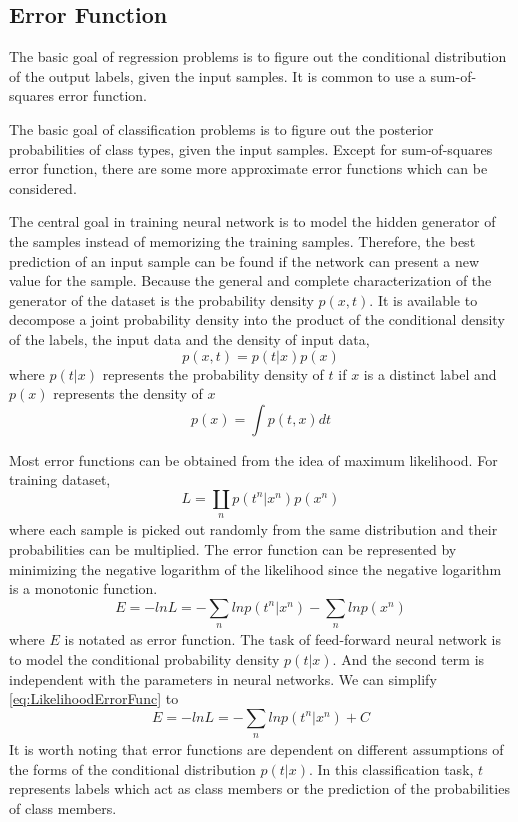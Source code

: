 \subsection{Error Function}

The basic goal of regression problems is to figure out the conditional distribution of the output labels, given the input samples. It is common to use a sum-of-squares error function.

The basic goal of classification problems is to figure out the posterior probabilities of class types, given the input samples. Except for sum-of-squares error function, there are some more approximate error functions which can be considered.

The central goal in training neural network is to model the hidden generator of the samples instead of memorizing the training samples. Therefore, the best prediction of an input sample can be found if the network can present a new value for the sample. Because the general and complete characterization of the generator of the dataset is the probability density $p(x,t)$. It is available to decompose a joint probability density into the product of the conditional density of the labels, the input data and the density of input data,
\begin{equation}\label{eq:JointProbDensity}
p(x,t) = p(t|x)p(x)
\end{equation}
where $p(t|x)$ represents the probability density of $t$ if $x$ is a distinct label and $p(x)$ represents the density of $x$
\begin{equation}\label{eq:ProbDensityX}
p(x) = \int p(t,x)dt
\end{equation}

Most error functions can be obtained from the idea of maximum likelihood. For training dataset, 
\begin{equation}\label{eq:LikelihoodLoss}
L = \coprod_{\substack{n}}  p(t^n|x^n)p(x^n)
\end{equation}
where each sample is picked out randomly from the same  distribution and their probabilities can be multiplied. The error function can be represented by minimizing the negative logarithm of the likelihood since the negative logarithm is a monotonic function.
\begin{equation}\label{eq:LikelihoodErrorFunc}
E = -ln L = -\sum_{\substack{n}} ln p(t^n|x^n) - \sum_{\substack{n}}lnp(x^n)
\end{equation}
where $E$ is notated as error function. The task of feed-forward neural network is to model the conditional probability density $p(t|x)$. And the second term is independent with the parameters in neural networks.  We can simplify \ref{eq:LikelihoodErrorFunc} to
\begin{equation}\label{eq:SimLikelihoodErrorFunc}
E = -ln L = -\sum_{\substack{n}} ln p(t^n|x^n) + C
\end{equation}
It is worth noting that error functions are dependent on different assumptions of the forms of the conditional distribution $p(t|x)$. In this classification task, $t$ represents labels which act as class members or the prediction of the probabilities of class members.

